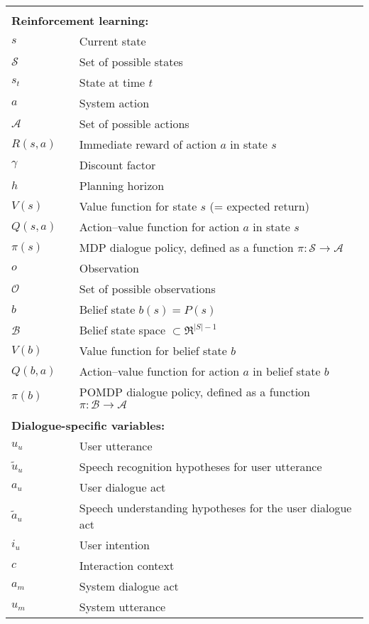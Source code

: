 \begin{longtable}{lp{5mm}p{11cm}}
&&  \vspace{0mm} \\
\multicolumn{3}{l}{\textbf{Reinforcement learning:}} \vspace{2mm} \\
$s$ && Current state \\
$\mathcal{S}$ && Set of possible states \\
$s_t$ && State at time $t$ \\
$a$ && System action \\ 
$\mathcal{A}$ && Set of possible actions \\
$R(s,a)$ && Immediate reward of action $a$ in state $s$ \\
$\gamma$ && Discount factor \\
$h$ && Planning horizon \\
$V(s)$ && Value function for state $s$ (= expected return) \\
$Q(s,a)$ && Action--value function for action $a$ in state $s$  \\
$\pi(s)$ && MDP dialogue policy, defined as a function $\pi: \mathcal{S} \rightarrow \mathcal{A} $ \\
$o$ && Observation \\
$\mathcal{O}$ && Set of possible observations \\
$b$ && Belief state $b(s) = P(s)$ \\
$\mathcal{B}$ && Belief state space $\subset \Re^{|S|-1}$ \\
$V(b)$ && Value function for belief state $b$  \\
$Q(b,a)$ && Action--value function for action $a$ in belief state $b$ \\
$\pi(b)$ && POMDP dialogue policy, defined as a function $\pi: \mathcal{B} \rightarrow \mathcal{A} $ \\

&&  \vspace{3mm} \\
\multicolumn{3}{l}{\textbf{Dialogue-specific variables:}} \vspace{2mm} \\

$u_u$ && User utterance \\
$\tilde{u}_u$ && Speech recognition hypotheses for user utterance \\
$a_u$ && User dialogue act \\
$\tilde{a}_u$ && Speech understanding hypotheses for the user dialogue act \\
$i_u$ && User intention \\
$c$ && Interaction context \\
$a_m$ && System dialogue act \\
$u_m$ && System utterance \\


\end{longtable}
